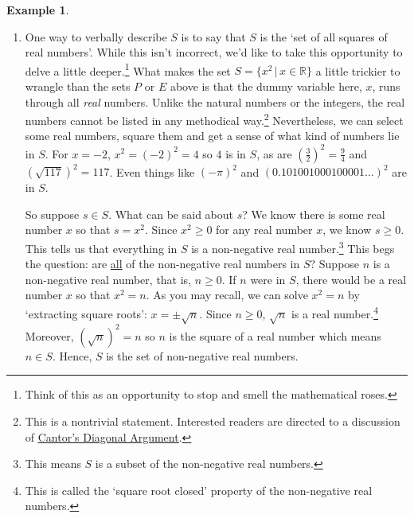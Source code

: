 \documentclass[11pt]{article}
\theoremstyle{definition}  %
\newtheorem{ex}{\bf Example}
\begin{document}
\begin{ex}
\begin{enumerate}
\smallskip

Proceeding in the same way, we generate elements in $E = \{ 2n \, | \, n \in \mathbb Z \}$ by plugging in integer values of $n$ into the formula $2n$.  Starting with $n = 0$ we obtain $2(0) = 0$.  For $n = 1$ we get $2(1) = 2$, for $n = -1$ we get $2(-1) = -2$ for $n = 2$, we get $2(2) = 4$ and for $n = -2$ we get $2(-2) = -4$.  As $n$  moves through the integers, $2n$ produces all of the \textit{even} integers.\footnote{This shouldn't be too surprising, since an even integer is \textit{defined} to be an integer multiple of $2$.} A roster description for  $E$ is $E = \{ 0, \pm 2, \pm 4, \ldots \}$.

\item  One way to verbally describe $S$ is to say that $S$ is the `set of all squares of real numbers'.  While this isn't incorrect, we'd like to take this opportunity to delve a little deeper.\footnote{Think of this as an opportunity to stop and smell the mathematical roses.}  What makes the set $S = \{ x^2 \, | \, x \in \mathbb{R} \}$ a little trickier to wrangle than the sets $P$ or $E$ above is that the dummy variable here, $x$, runs through all \textit{real} numbers.  Unlike the natural numbers or the integers, the real numbers cannot be listed in any methodical way.\footnote{This is a nontrivial statement.  Interested readers are directed to a discussion of \href{http://en.wikipedia.org/wiki/Cantor's_diagonal_argument}{\underline{Cantor's Diagonal Argument}}.}  Nevertheless, we can select some real numbers, square them and get a sense of what kind of numbers lie in $S$.  For $x = -2$, $x^2 = (-2)^2 = 4$ so $4$ is in $S$, as are $\left(\frac{3}{2}\right)^2 = \frac{9}{4}$ and $(\sqrt{117})^2 = 117$.  Even things like $(-\pi)^2$ and $(0.101001000100001 \ldots)^2$ are in $S$.  

\smallskip

So suppose $s \in S$.  What can be said about $s$?  We know there is some real number $x$ so that $s = x^2$.  Since $x^2 \geq 0$ for any real number $x$, we know $s \geq 0$.  This tells us that everything in $S$ is a non-negative real number.\footnote{This means $S$ is a subset of the non-negative real numbers.}  This begs the question:  are \underline{all} of the non-negative real numbers in $S$?  Suppose $n$ is a non-negative real number, that is, $n \geq 0$.  If $n$ were in $S$, there would be a real number $x$ so that $x^2=n$.  As you may recall, we can solve $x^2 = n$ by `extracting square roots':  $x = \pm \sqrt{n}$.  Since $n \geq 0$, $\sqrt{n}$ is a real number.\footnote{This is called the `square root closed' property of the non-negative real numbers.}  Moreover, $(\sqrt{n})^2 = n$ so $n$ is the square of a real number which means $n \in S$. Hence, $S$ is the set of non-negative real numbers.


\end{enumerate}
\end{ex}
\end{document}
